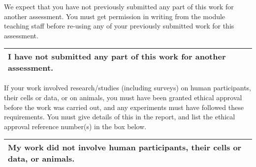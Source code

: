 \noindent We expect that you have not previously submitted any part of this work for another assessment.
You must get permission in writing from the module teaching staff before re-using any of your
previously submitted work for this assessment.

\begin{longtable}[ht]{ | p{\textwidth} | }
  \hline
  \textbf{I have not submitted any part of this work for another assessment.}
  \\\hline
\end{longtable}

\noindent If your work involved research/studies (including surveys) on human participants, their cells or
data, or on animals, you must have been granted ethical approval before the work was carried
out, and any experiments must have followed these requirements. You must give details of this in
the report, and list the ethical approval reference number(s) in the box below.

\begin{longtable}[ht]{ | p{\textwidth} | }
  \hline
  \textbf{My work did not involve human participants, their cells or data, or animals.}
  \\\hline
\end{longtable}
